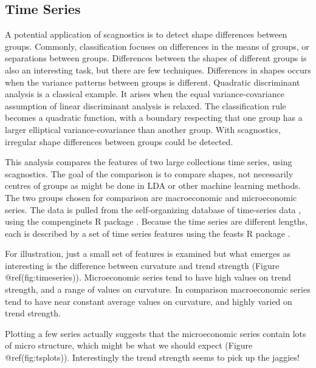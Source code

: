 \hypertarget{time-series}{%
\subsection{Time Series}\label{time-series}}

A potential application of scagnostics is to detect shape differences
between groups. Commonly, classification focuses on differences in the
means of groups, or separations between groups. Differences between the
shapes of different groups is also an interesting task, but there are
few techniques. Differences in shapes occurs when the variance patterns
between groups is different. Quadratic discriminant analysis is a
classical example. It arises when the equal variance-covariance
assumption of linear discriminant analysis is relaxed. The
classification rule becomes a quadratic function, with a boundary
respecting that one group has a larger elliptical variance-covariance
than another group. With scagnostics, irregular shape differences
between groups could be detected.

This analysis compares the features of two large collections time
series, using scagnostics. The goal of the comparison is to compare
shapes, not necessarily centres of groups as might be done in LDA or
other machine learning methods. The two groups chosen for comparison are
macroeconomic and microeconomic series. The data is pulled from the
self-organizing database of time-series data \citep{sots}, using the
compenginets R package \citep{compenginets}. Because the time series are
different lengths, each is described by a set of time series features
\citep[chapter 4 of][]{fpp} using the feasts R package \citep{feasts}.

For illustration, just a small set of features is examined but what
emerges as interesting is the difference between curvature and trend
strength (Figure @ref(fig:timeseries)). Microeconomic series tend to
have high values on trend strength, and a range of values on curvature.
In comparison macroeconomic series tend to have near constant average
values on curvature, and highly varied on trend strength.

Plotting a few series actually suggests that the microeconomic series
contain lots of micro structure, which might be what we should expect
(Figure @ref(fig:tsplots)). Interestingly the trend strength seems to
pick up the jaggies!

